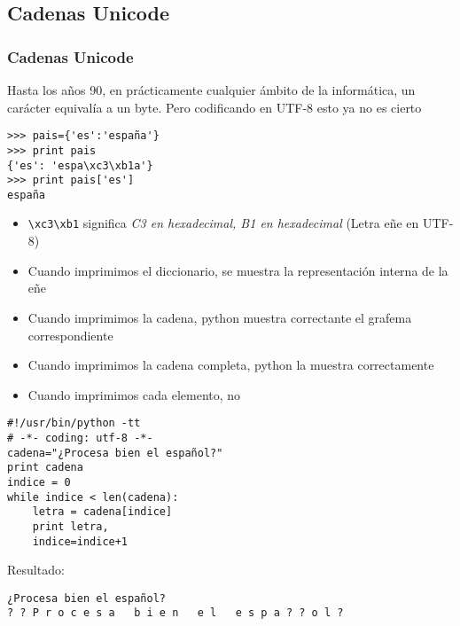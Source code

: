 \documentclass[ucs]{beamer}
\begin{document}
\subsection{Cadenas Unicode}
\begin{frame}[fragile]
\frametitle{Cadenas Unicode}
Hasta los años 90, en prácticamente cualquier ámbito de la informática, un carácter equivalía
a un byte. Pero
codificando en UTF-8 esto ya no es cierto

  \begin{footnotesize}
  \begin{verbatim}
>>> pais={'es':'españa'}
>>> print pais
{'es': 'espa\xc3\xb1a'}
>>> print pais['es']
españa
  \end{verbatim}
  \end{footnotesize}

\begin{itemize}
\item
\verb|\xc3\xb1| significa \emph{C3 en hexadecimal,  B1 en hexadecimal} (Letra eñe en UTF-8)
\item
Cuando imprimimos el diccionario, se muestra la representación interna de la eñe
\item
Cuando imprimimos la cadena, python muestra correctante el grafema correspondiente
\end{itemize}
\end{frame}


\begin{frame}[fragile]
\begin{itemize}
\item
Cuando imprimimos la cadena completa, python la muestra correctamente
\item
Cuando imprimimos cada elemento, no
\end{itemize}


  \begin{footnotesize}
  \begin{verbatim}
#!/usr/bin/python -tt
# -*- coding: utf-8 -*-
cadena="¿Procesa bien el español?"
print cadena
indice = 0
while indice < len(cadena):
    letra = cadena[indice]
    print letra,
    indice=indice+1
  \end{verbatim}
  \end{footnotesize}

Resultado:

  \begin{footnotesize}
  \begin{verbatim}
¿Procesa bien el español?
? ? P r o c e s a   b i e n   e l   e s p a ? ? o l ?
  \end{verbatim}
  \end{footnotesize}
\end{frame}
\end{document}
